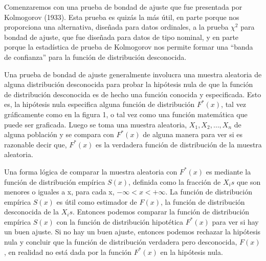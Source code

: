 \documentclass[a4paper,oneside,openany]{book}
\begin{document}
Comenzaremos con una prueba de bondad de ajuste que fue presentada por
Kolmogorov (1933). Esta prueba es quizás la más útil, en parte porque
nos proporciona una alternativa, diseñada para datos ordinales, a la
prueba \(\chi^2\) para bondad de ajuste, que fue diseñada para datos de
tipo nominal, y en parte porque la estadística de prueba de Kolmogorov
nos permite formar una ``banda de confianza'' para la función de
distribución desconocida.

Una prueba de bondad de ajuste generalmente involucra una muestra
aleatoria de alguna distribución desconocida para probar la hipótesis
nula de que la función de distribución desconocida es de hecho una
función conocida y especificada. Esto es, la hipótesis nula especifica
alguna función de distribución \(F ^*(x)\), tal vez gráficamente como en
la figura 1, o tal vez como una función matemática que puede ser
graficada. Luego se toma una muestra aleatoria,
\(X_{1},X_{2},\ldots, X_{n}\) de alguna población y se compara con
\(F^*(x)\) de alguna manera para ver si es razonable decir que,
\(F^*(x)\) es la verdadera función de distribución de la muestra
aleatoria.

Una forma lógica de comparar la muestra aleatoria con \(F^*(x)\) es
mediante la función de distribución empírica \(S(x)\), definida como la
fracción de \(X_{i}s\) que son menores o iguales a x, para cada x,
\(-\infty<x< + \infty\). La función de distribución empírica \(S(x)\) es
útil como estimador de \(F(x)\), la función de distribución desconocida
de la \(X_{i}s\). Entonces podemos comparar la función de distribución
empírica \(S(x)\) con la función de distribución hipotética \(F^*(x)\)
para ver si hay un buen ajuste. Si no hay un buen ajuste, entonces
podemos rechazar la hipótesis nula y concluir que la función de
distribución verdadera pero desconocida, \(F(x)\), en realidad no está
dada por la función \(F^*(x)\) en la hipótesis nula.
\end{document}

